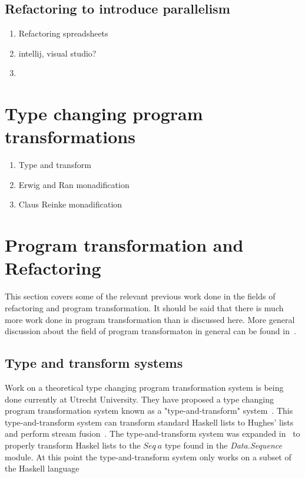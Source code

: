\subsection{Refactoring to introduce parallelism}

\begin{enumerate}
\item Refactoring spreadsheets
\item intellij, visual studio?
\item 
\end{enumerate}

\section{Type changing program transformations}\label{typeTrans}

\begin{enumerate}
\item Type and transform
\item Erwig and Ran monadification
\item Claus Reinke monadification
\end{enumerate}


\section{Program transformation and Refactoring}\label{progTran}

This section covers some of the relevant previous work done in the fields of refactoring and program transformation. It should be said that there is much more work done in program transformation than is discussed here. More general discussion about the field of program transformaton in general can be found in~\citep{visserSurvey,transformationIntro}.

\subsection{Type and transform systems}

Work on a theoretical type changing program transformation system is being done currently at Utrecht University. They have proposed a type changing program transformation system known as a "type-and-transform" system~\citep{typeAndTransform}. This type-and-transform system can transform standard Haskell lists to Hughes' lists and perform stream fusion~\citep{typeAndTransform}. The type-and-transform system was expanded in~\citep{typeAndTransformPatterns} to properly transform Haskel lists to the $Seq~a$ type found in the \textit{Data.Sequence} module. At this point the type-and-transform system only works on a subset of the Haskell language~\citep{typeAndTransform}

